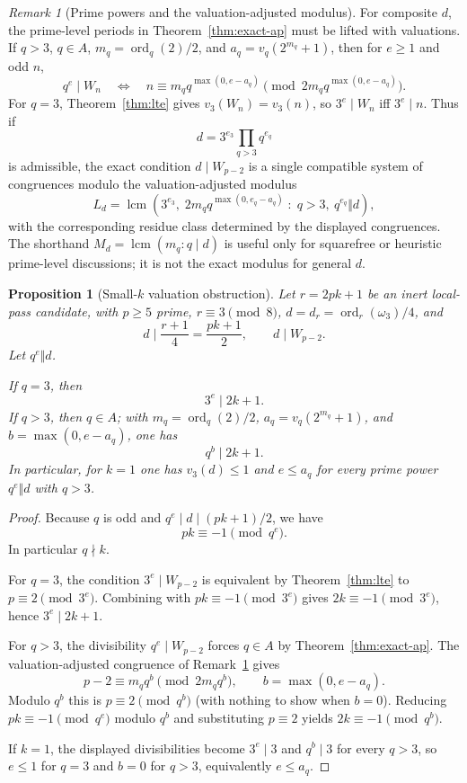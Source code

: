 \documentclass[11pt]{amsart}
\theoremstyle{plain}
\newtheorem{proposition}[theorem]{Proposition}
\theoremstyle{definition}
\theoremstyle{remark}
\newtheorem{remark}[theorem]{Remark}
\numberwithin{equation}{section}
\newcommand{\ord}{\operatorname{ord}}
\begin{document}
\begin{remark}[Prime powers and the valuation-adjusted modulus]\label{rem:valuation-adjusted-Ld}
For composite $d$, the prime-level periods in Theorem~\ref{thm:exact-ap} must be lifted with valuations. If $q>3$, $q\in A$, $m_q=\ord_q(2)/2$, and $a_q=v_q(2^{m_q}+1)$, then for $e\geq1$ and odd $n$,
\[
  q^e \mid W_n
  \quad\Longleftrightarrow\quad
  n \equiv m_q q^{\max(0,e-a_q)}
  \pmod{2m_q q^{\max(0,e-a_q)}}.
\]
For $q=3$, Theorem~\ref{thm:lte} gives $v_3(W_n)=v_3(n)$, so $3^e\mid W_n$ iff $3^e\mid n$. Thus if
\[
  d=3^{e_3}\prod_{q>3}q^{e_q}
\]
is admissible, the exact condition $d\mid W_{p-2}$ is a single compatible system of congruences modulo the valuation-adjusted modulus
\[
  L_d=\operatorname{lcm}\!\left(
    3^{e_3},
    \;2m_q q^{\max(0,e_q-a_q)} \;:\; q>3,\ q^{e_q}\Vert d
  \right),
\]
with the corresponding residue class determined by the displayed congruences. The shorthand $M_d=\operatorname{lcm}(m_q:q\mid d)$ is useful only for squarefree or heuristic prime-level discussions; it is not the exact modulus for general $d$.
\end{remark}

\begin{proposition}[Small-$k$ valuation obstruction]\label{prop:small-k-valuation}
Let $r=2pk+1$ be an inert local-pass candidate, with $p\geq5$ prime, $r\equiv3\pmod8$, $d=d_r=\ord_r(\omega_3)/4$, and
\[
  d\mid \frac{r+1}{4}=\frac{pk+1}{2},
  \qquad
  d\mid W_{p-2}.
\]
Let $q^e\Vert d$.

If $q=3$, then
\[
  3^e\mid 2k+1.
\]
If $q>3$, then $q\in A$; with $m_q=\ord_q(2)/2$, $a_q=v_q(2^{m_q}+1)$, and $b=\max(0,e-a_q)$, one has
\[
  q^b\mid 2k+1.
\]
In particular, for $k=1$ one has $v_3(d)\leq1$ and $e\leq a_q$ for every prime power $q^e\Vert d$ with $q>3$.
\end{proposition}

\begin{proof}
Because $q$ is odd and $q^e\mid d\mid(pk+1)/2$, we have
\[
  pk\equiv -1 \pmod {q^e}.
\]
In particular $q\nmid k$.

For $q=3$, the condition $3^e\mid W_{p-2}$ is equivalent by Theorem~\ref{thm:lte} to $p\equiv2\pmod{3^e}$. Combining with $pk\equiv-1\pmod{3^e}$ gives $2k\equiv-1\pmod{3^e}$, hence $3^e\mid2k+1$.

For $q>3$, the divisibility $q^e\mid W_{p-2}$ forces $q\in A$ by Theorem~\ref{thm:exact-ap}. The valuation-adjusted congruence of Remark~\ref{rem:valuation-adjusted-Ld} gives
\[
  p-2\equiv m_q q^b \pmod {2m_q q^b},\qquad b=\max(0,e-a_q).
\]
Modulo $q^b$ this is $p\equiv2\pmod {q^b}$ (with nothing to show when $b=0$). Reducing $pk\equiv-1\pmod {q^e}$ modulo $q^b$ and substituting $p\equiv2$ yields $2k\equiv-1\pmod {q^b}$.

If $k=1$, the displayed divisibilities become $3^e\mid3$ and $q^b\mid3$ for every $q>3$, so $e\leq1$ for $q=3$ and $b=0$ for $q>3$, equivalently $e\leq a_q$.
\end{proof}
\end{document}
